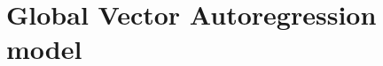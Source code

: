 \documentclass[titlepage,oneside,12pt]{article}
\newcommand{\?}{\stackrel{?}{=}}
\begin{document}





\section{Global Vector Autoregression model}



\end{document}
